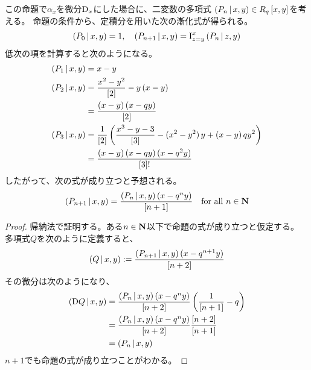 {	この命題で$\alpha_x$を微分${\mathinner{\operatorname{D}}}_x$にした場合に、二変数の多項式
	$\mathinner{({P_n{\,|\,}x,y})}\in R_q\mathinner{[{x,y}]}$を考える。
	命題の条件から、定積分を用いた次の漸化式が得られる。
	\begin{equation*}\begin{split}
		\mathinner{({P_0{\,|\,}x,y})} = 1,\quad
		\mathinner{({P_{n+1}{\,|\,}x,y})} = {\mathinner{\operatorname{I}}}_{z=y}^x\mathinner{({P_n{\,|\,}z,y})}
	\end{split}\end{equation*}
	低次の項を計算すると次のようになる。
	\begin{equation*}\begin{split}
		\mathinner{({P_1{\,|\,}x,y})} &= x - y \\
		\mathinner{({P_2{\,|\,}x,y})} &= \frac{x^2 - y^2}{{\mathinner{[{2}]}}} - y\mathinner{({x-y})} \\
		&= \frac{\mathinner{({x - y})}\mathinner{({x - qy})}}{{\mathinner{[{2}]}}} \\
		\mathinner{({P_3{\,|\,}x,y})} &= \frac{1}{{\mathinner{[{2}]}}}\mathinner{\left({\frac{x^3-y-3}{{\mathinner{[{3}]}}}
			- \mathinner{({x^2-y^2})}y + \mathinner{({x-y})}qy^2}\right)} \\
		&= \frac{\mathinner{({x - y})}\mathinner{({x - qy})}\mathinner{({x - q^2y})}}{{\mathinner{[{3}]}}!} \\
	\end{split}\end{equation*}
	したがって、次の式が成り立つと予想される。
	\begin{equation*}\begin{split}
		\mathinner{({P_{n+1}{\,|\,}x,y})} = \frac{\mathinner{({P_n{\,|\,}x,y})}\mathinner{({x-q^ny})}}{{\mathinner{[{n+1}]}}}
		\quad\text{for all } n\in\mathbf{N}
	\end{split}\end{equation*}
	\begin{proof} %
		帰納法で証明する。ある$n\in\mathbf{N}$以下で命題の式が成り立つと仮定する。
		多項式$Q$を次のように定義すると、
		\begin{equation*}\begin{split}
			\mathinner{({Q{\,|\,}x,y})} := \frac{\mathinner{({P_{n+1}{\,|\,}x,y})}\mathinner{({x-q^{n+1}y})}}{{\mathinner{[{n+2}]}}}
		\end{split}\end{equation*}
		その微分は次のようになり、
		\begin{equation*}\begin{split}
			\mathinner{({{\mathinner{\operatorname{D}}}Q{\,|\,}x,y})} &= \frac{\mathinner{({P_n{\,|\,}x,y})}\mathinner{({x-q^ny})}}{{\mathinner{[{n+2}]}}}
				\mathinner{\left({\frac{1}{{\mathinner{[{n+1}]}}} - q}\right)} \\
			&= \frac{\mathinner{({P_n{\,|\,}x,y})}\mathinner{({x-q^ny})}}{{\mathinner{[{n+2}]}}}\frac{{\mathinner{[{n+2}]}}}{{\mathinner{[{n+1}]}}} \\
			&= \mathinner{({P_n{\,|\,}x,y})}
		\end{split}\end{equation*}
		$n+1$でも命題の式が成り立つことがわかる。
	\end{proof} %

}
